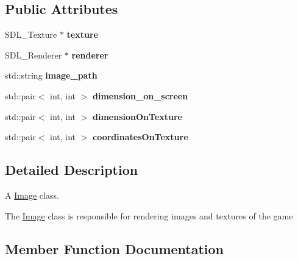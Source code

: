 \subsection*{Public Attributes}
\begin{DoxyCompactItemize}
\item 
S\+D\+L\+\_\+\+Texture $\ast$ {\bfseries texture}\hypertarget{classengine_1_1_image_a1aba43ce4fe48d3c18e4db97543c1077}{}\label{classengine_1_1_image_a1aba43ce4fe48d3c18e4db97543c1077}

\item 
S\+D\+L\+\_\+\+Renderer $\ast$ {\bfseries renderer}\hypertarget{classengine_1_1_image_a5ec39840fc23236d16dcdef43b87fc91}{}\label{classengine_1_1_image_a5ec39840fc23236d16dcdef43b87fc91}

\item 
std\+::string {\bfseries image\+\_\+path}\hypertarget{classengine_1_1_image_a57960b0ab1636eacff1a5b64d7402b37}{}\label{classengine_1_1_image_a57960b0ab1636eacff1a5b64d7402b37}

\item 
std\+::pair$<$ int, int $>$ {\bfseries dimension\+\_\+on\+\_\+screen}\hypertarget{classengine_1_1_image_abbbfdb4ce895511ce54105078fb39ebb}{}\label{classengine_1_1_image_abbbfdb4ce895511ce54105078fb39ebb}

\item 
std\+::pair$<$ int, int $>$ {\bfseries dimension\+On\+Texture}\hypertarget{classengine_1_1_image_aae242af0f586f7c31ffe38657bd0506c}{}\label{classengine_1_1_image_aae242af0f586f7c31ffe38657bd0506c}

\item 
std\+::pair$<$ int, int $>$ {\bfseries coordinates\+On\+Texture}\hypertarget{classengine_1_1_image_ab050b1278f3e32a44ceffe9365aa867b}{}\label{classengine_1_1_image_ab050b1278f3e32a44ceffe9365aa867b}

\end{DoxyCompactItemize}


\subsection{Detailed Description}
A \hyperlink{classengine_1_1_image}{Image} class. 

The \hyperlink{classengine_1_1_image}{Image} class is responsible for rendering images and textures of the game 

\subsection{Member Function Documentation}
